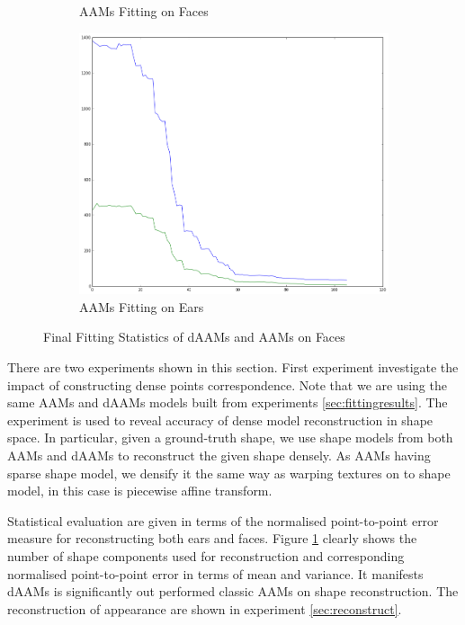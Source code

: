 \begin{figure}[h]
\begin{subfigure}[b]{0.2\textwidth}
        \caption{AAMs Fitting on Faces}
    \end{subfigure}
    \qquad
    \begin{subfigure}[b]{0.2\textwidth}
            \includegraphics[width=\textwidth]{supports/Model_Analysis/Shape_Reconstruct_ear_aam_test}
        \caption{AAMs Fitting on Ears}
    \end{subfigure}
    \caption{Final Fitting Statistics of dAAMs and AAMs on Faces}
    \label{fig:rc_face}
\end{figure}

There are two experiments shown in this section. First experiment investigate the impact of constructing dense points correspondence. Note that we are using the same AAMs and dAAMs models built from experiments \ref{sec:fittingresults}. The experiment is used to reveal accuracy of dense model reconstruction in shape space. In particular, given a ground-truth shape, we use shape models from both AAMs and dAAMs to reconstruct the given shape densely. As AAMs having sparse shape model, we densify it the same way as warping textures on to shape model, in this case is piecewise affine transform. 

Statistical evaluation are given in terms of the normalised point-to-point error
measure for reconstructing both ears and faces. Figure \ref{fig:rc_face} clearly shows the number of shape components used for reconstruction and corresponding normalised point-to-point error in terms of mean and variance. It manifests dAAMs is significantly out performed classic AAMs on shape reconstruction. The reconstruction of appearance are shown in experiment \ref{sec:reconstruct}.

